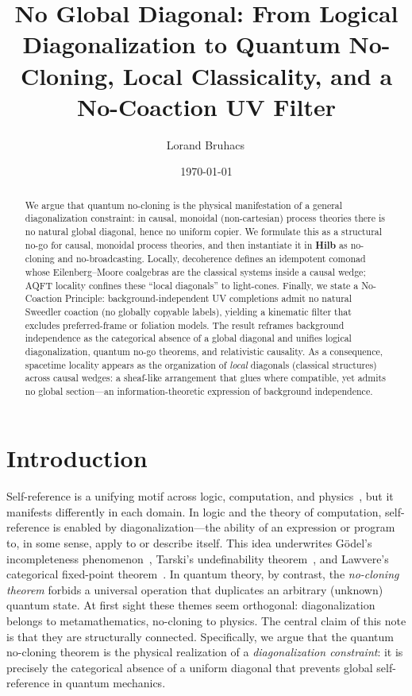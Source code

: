 \documentclass[11pt]{article}
\title{No Global Diagonal: From Logical Diagonalization to Quantum No-Cloning, Local Classicality, and a No-Coaction UV Filter}
\author{Lorand Bruhacs\,\orcidlink{0009-0004-6751-0715}}
\date{\normalsize \today}
\theoremstyle{upright}
\begin{document}
\maketitle

\begin{abstract}
We argue that quantum no-cloning is the physical manifestation of a general diagonalization constraint: in causal, monoidal (non-cartesian) process theories there is no natural global diagonal, hence no uniform copier. We formulate this as a structural no-go for causal, monoidal process theories, and then instantiate it in \textbf{Hilb} as no-cloning and no-broadcasting.
Locally, decoherence defines an idempotent comonad whose Eilenberg--Moore coalgebras are the classical systems inside a causal wedge; AQFT locality confines these ``local diagonals'' to light-cones. Finally, we state a No-Coaction Principle: background-independent UV completions admit no natural Sweedler coaction (no globally copyable labels), yielding a kinematic filter that excludes preferred-frame or foliation models. The result reframes background independence as the categorical absence of a global diagonal and unifies logical diagonalization, quantum no-go theorems, and relativistic causality. As a consequence, spacetime locality appears as the organization of \emph{local} diagonals (classical structures) across causal wedges: a sheaf-like arrangement that glues where compatible, yet admits no global section—an information-theoretic expression of background independence.

\end{abstract}

\tableofcontents

\section{Introduction}
\label{sec:intro}

\paragraph{}
Self-reference is a unifying motif across logic, computation, and physics~\cite{BaezStay2011}, but it manifests differently in each domain. In logic and the theory of computation, self-reference is enabled by diagonalization---the ability of an expression or program to, in some sense, apply to or describe itself. This idea underwrites Gödel's incompleteness phenomenon~\cite{Godel1931}, Tarski's undefinability theorem~\cite{Tarski1936}, and Lawvere's categorical fixed-point theorem~\cite{Lawvere1969}. In quantum theory, by contrast, the \emph{no-cloning theorem} forbids a universal operation that duplicates an arbitrary (unknown) quantum state. At first sight these themes seem orthogonal: diagonalization belongs to metamathematics, no-cloning to physics. The central claim of this note is that they are structurally connected. Specifically, we argue that the quantum no-cloning theorem is the physical realization of a \emph{diagonalization constraint}: it is precisely the categorical absence of a uniform diagonal that prevents global self-reference in quantum mechanics.
\end{document}
